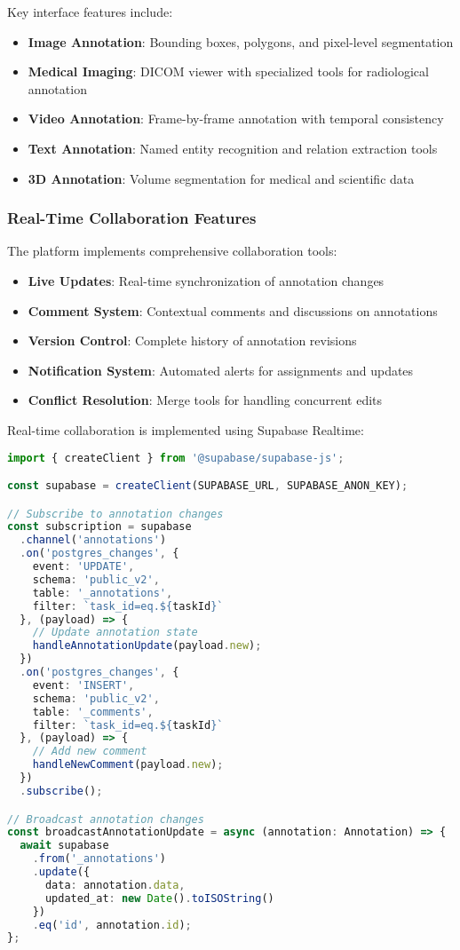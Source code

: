 Key interface features include:

\begin{itemize}
    \item \textbf{Image Annotation}: Bounding boxes, polygons, and pixel-level segmentation
    \item \textbf{Medical Imaging}: DICOM viewer with specialized tools for radiological annotation
    \item \textbf{Video Annotation}: Frame-by-frame annotation with temporal consistency
    \item \textbf{Text Annotation}: Named entity recognition and relation extraction tools
    \item \textbf{3D Annotation}: Volume segmentation for medical and scientific data
\end{itemize}

\subsubsection{Real-Time Collaboration Features}

The platform implements comprehensive collaboration tools:

\begin{itemize}
    \item \textbf{Live Updates}: Real-time synchronization of annotation changes
    \item \textbf{Comment System}: Contextual comments and discussions on annotations
    \item \textbf{Version Control}: Complete history of annotation revisions
    \item \textbf{Notification System}: Automated alerts for assignments and updates
    \item \textbf{Conflict Resolution}: Merge tools for handling concurrent edits
\end{itemize}

Real-time collaboration is implemented using Supabase Realtime:

\begin{lstlisting}[language=typescript, caption=Real-time Collaboration Implementation]
import { createClient } from '@supabase/supabase-js';

const supabase = createClient(SUPABASE_URL, SUPABASE_ANON_KEY);

// Subscribe to annotation changes
const subscription = supabase
  .channel('annotations')
  .on('postgres_changes', {
    event: 'UPDATE',
    schema: 'public_v2',
    table: '_annotations',
    filter: `task_id=eq.${taskId}`
  }, (payload) => {
    // Update annotation state
    handleAnnotationUpdate(payload.new);
  })
  .on('postgres_changes', {
    event: 'INSERT', 
    schema: 'public_v2',
    table: '_comments',
    filter: `task_id=eq.${taskId}`
  }, (payload) => {
    // Add new comment
    handleNewComment(payload.new);
  })
  .subscribe();

// Broadcast annotation changes
const broadcastAnnotationUpdate = async (annotation: Annotation) => {
  await supabase
    .from('_annotations')
    .update({
      data: annotation.data,
      updated_at: new Date().toISOString()
    })
    .eq('id', annotation.id);
};
\end{lstlisting}

